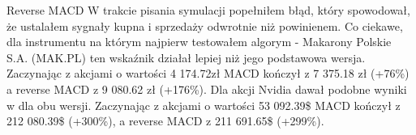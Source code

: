 \documentclass{article}
\begin{document}
\begin{section}{Reverse MACD}
    W trakcie pisania symulacji popełniłem błąd, który spowodował, że ustalałem sygnały kupna i sprzedaży odwrotnie niż powinienem. Co ciekawe, dla instrumentu
    na którym najpierw testowałem algorym - Makarony Polskie S.A. (MAK.PL) ten wskaźnik działał lepiej niż jego podstawowa wersja. Zaczynając z akcjami o wartości 4 174.72zł 
    MACD kończył z 7 375.18 zł (+76\%) a reverse MACD z 9 080.62 zł (+176\%). Dla akcji Nvidia dawał podobne wyniki w dla obu wersji. 
    Zaczynając z akcjami o wartości 53 092.39\$ MACD kończył z 212 080.39\$ (+300\%), 
    a reverse MACD z 211 691.65\$ (+299\%).
    \begin{figure}[H]
        \centering
    \end{figure}
    \begin{figure}[H]

\end{figure}
\end{section}
\end{document}
